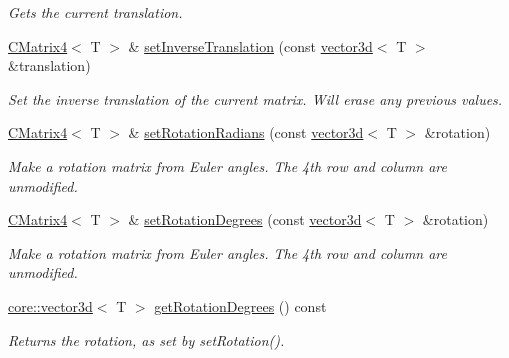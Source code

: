 \begin{DoxyCompactItemize}
\begin{DoxyCompactList}\small\item\em Gets the current translation. \end{DoxyCompactList}\item 
\mbox{\label{classirr_1_1core_1_1CMatrix4_a15e4ccdadd086b0f25260ac445077208}} 
\hyperlink{classirr_1_1core_1_1CMatrix4}{C\+Matrix4}$<$ T $>$ \& \hyperlink{classirr_1_1core_1_1CMatrix4_a15e4ccdadd086b0f25260ac445077208}{set\+Inverse\+Translation} (const \hyperlink{classirr_1_1core_1_1vector3d}{vector3d}$<$ T $>$ \&translation)
\begin{DoxyCompactList}\small\item\em Set the inverse translation of the current matrix. Will erase any previous values. \end{DoxyCompactList}\item 
\mbox{\label{classirr_1_1core_1_1CMatrix4_a8c0114129f1567ea366fa16bd6c2ae11}} 
\hyperlink{classirr_1_1core_1_1CMatrix4}{C\+Matrix4}$<$ T $>$ \& \hyperlink{classirr_1_1core_1_1CMatrix4_a8c0114129f1567ea366fa16bd6c2ae11}{set\+Rotation\+Radians} (const \hyperlink{classirr_1_1core_1_1vector3d}{vector3d}$<$ T $>$ \&rotation)
\begin{DoxyCompactList}\small\item\em Make a rotation matrix from Euler angles. The 4th row and column are unmodified. \end{DoxyCompactList}\item 
\mbox{\label{classirr_1_1core_1_1CMatrix4_a87b9b376fbafa163885012fb371e7fbe}} 
\hyperlink{classirr_1_1core_1_1CMatrix4}{C\+Matrix4}$<$ T $>$ \& \hyperlink{classirr_1_1core_1_1CMatrix4_a87b9b376fbafa163885012fb371e7fbe}{set\+Rotation\+Degrees} (const \hyperlink{classirr_1_1core_1_1vector3d}{vector3d}$<$ T $>$ \&rotation)
\begin{DoxyCompactList}\small\item\em Make a rotation matrix from Euler angles. The 4th row and column are unmodified. \end{DoxyCompactList}\item 
\hyperlink{classirr_1_1core_1_1vector3d}{core\+::vector3d}$<$ T $>$ \hyperlink{classirr_1_1core_1_1CMatrix4_a10abcf70d27d7b274e6277e1e1ee5907}{get\+Rotation\+Degrees} () const
\begin{DoxyCompactList}\small\item\em Returns the rotation, as set by set\+Rotation(). \end{DoxyCompactList}\item 

\end{DoxyCompactItemize}
